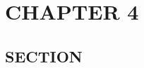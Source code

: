 \documentclass[../main/main]{subfiles}
\begin{document}
\chapter{CHAPTER 4}

\section{SECTION}

\printbibliography
\end{document}
